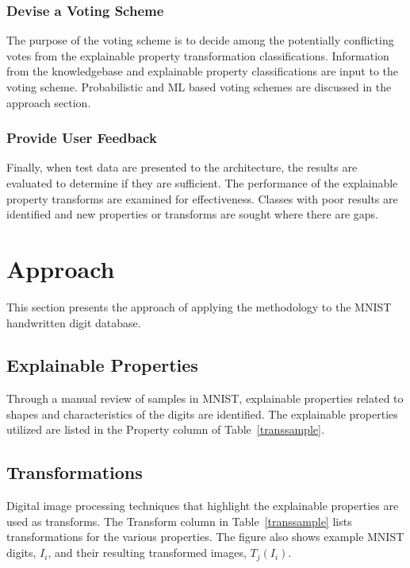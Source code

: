 \documentclass[conference]{IEEEtran}
\begin{document}
\subsubsection{Devise a Voting Scheme}
The purpose of the voting scheme is to decide among the potentially conflicting votes from the explainable property transformation classifications.  Information from the knowledgebase and explainable property classifications are input to the voting scheme.  Probabilistic and ML based voting schemes are discussed in the approach section.

\subsubsection{Provide User Feedback}
Finally, when test data are presented to the architecture, the results are evaluated to determine if they are sufficient.  The performance of the explainable property transforms are examined for effectiveness.  Classes with poor results are identified and new properties or transforms are sought where there are gaps.

\section{Approach}

This section presents the approach of applying the methodology to the MNIST handwritten digit database. 

\subsection{Explainable Properties}

Through a manual review of samples in MNIST, explainable properties related to shapes and characteristics of the digits are identified.  The explainable properties utilized are listed in the Property column of Table~\ref{transsample}.

\subsection{Transformations}
 
Digital image processing techniques that highlight the explainable properties are used as transforms.  The Transform column in Table~\ref{transsample} lists transformations for the various properties.  The figure also shows example MNIST digits, $I_i$, and their resulting transformed images, $T_j(I_i)$.
\end{document}
